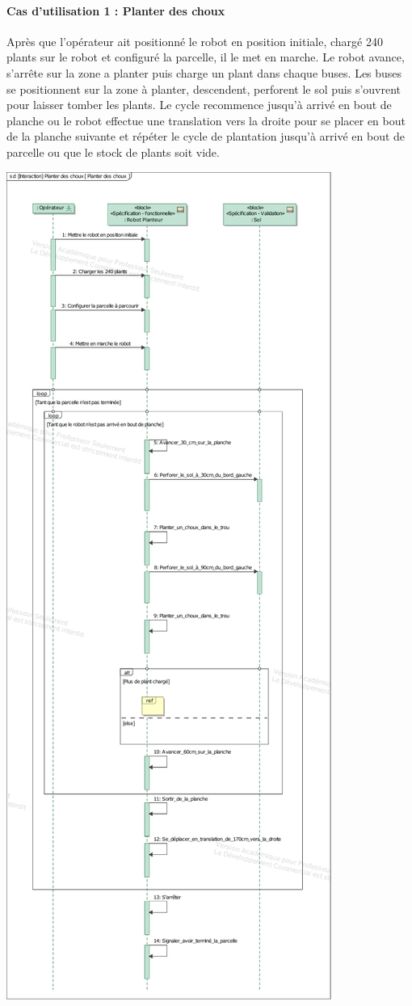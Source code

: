 \paragraph*{Cas d'utilisation 1 : Planter des choux}
Après que l’opérateur ait positionné le robot en position initiale, chargé 240 plants sur le robot et configuré la parcelle, il le met en marche.
Le robot avance, s’arrête sur la zone a planter puis charge un plant dans chaque buses. Les buses se positionnent sur la zone à planter, descendent, perforent le sol puis s'ouvrent pour laisser tomber les plants. Le cycle recommence jusqu’à arrivé en bout de planche ou le robot effectue une translation vers la droite pour se placer en bout de la planche suivante et répéter le cycle de plantation jusqu’à arrivé en bout de parcelle ou que le stock de plants soit vide.\begin{center}
\includegraphics[width=.5\textwidth]{./I/images/planterChoux.pdf}
\label{fig:diagSeqPlanterChoux}
\end{center} 


